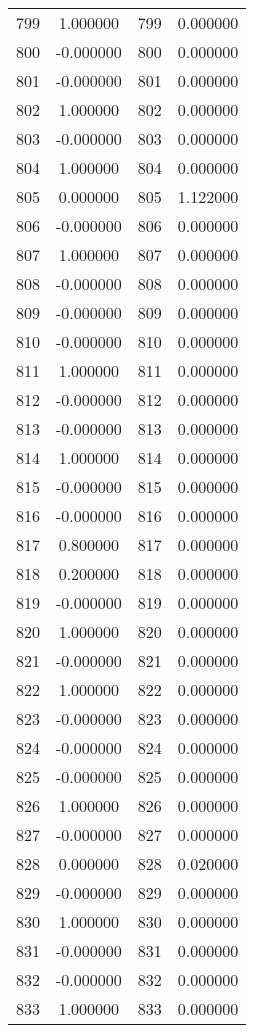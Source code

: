 \documentclass[12pt]{article}
\begin{document}
\begin{longtable}{@{}cccc@{}}
799 & 1.000000 & 799 & 0.000000 \\
800 & -0.000000 & 800 & 0.000000 \\
801 & -0.000000 & 801 & 0.000000 \\
802 & 1.000000 & 802 & 0.000000 \\
803 & -0.000000 & 803 & 0.000000 \\
804 & 1.000000 & 804 & 0.000000 \\
805 & 0.000000 & 805 & 1.122000 \\
806 & -0.000000 & 806 & 0.000000 \\
807 & 1.000000 & 807 & 0.000000 \\
808 & -0.000000 & 808 & 0.000000 \\
809 & -0.000000 & 809 & 0.000000 \\
810 & -0.000000 & 810 & 0.000000 \\
811 & 1.000000 & 811 & 0.000000 \\
812 & -0.000000 & 812 & 0.000000 \\
813 & -0.000000 & 813 & 0.000000 \\
814 & 1.000000 & 814 & 0.000000 \\
815 & -0.000000 & 815 & 0.000000 \\
816 & -0.000000 & 816 & 0.000000 \\
817 & 0.800000 & 817 & 0.000000 \\
818 & 0.200000 & 818 & 0.000000 \\
819 & -0.000000 & 819 & 0.000000 \\
820 & 1.000000 & 820 & 0.000000 \\
821 & -0.000000 & 821 & 0.000000 \\
822 & 1.000000 & 822 & 0.000000 \\
823 & -0.000000 & 823 & 0.000000 \\
824 & -0.000000 & 824 & 0.000000 \\
825 & -0.000000 & 825 & 0.000000 \\
826 & 1.000000 & 826 & 0.000000 \\
827 & -0.000000 & 827 & 0.000000 \\
828 & 0.000000 & 828 & 0.020000 \\
829 & -0.000000 & 829 & 0.000000 \\
830 & 1.000000 & 830 & 0.000000 \\
831 & -0.000000 & 831 & 0.000000 \\
832 & -0.000000 & 832 & 0.000000 \\
833 & 1.000000 & 833 & 0.000000 \\

\end{longtable}
\end{document}
